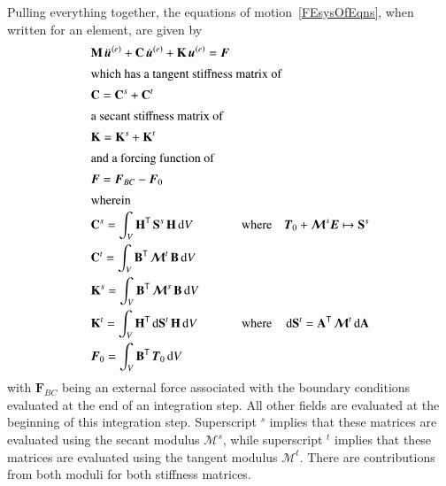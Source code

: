 Pulling everything together, the equations of motion~\eqref{FEsysOfEqns}, when written for an element, are given by
\begin{subequations}
    \label{EOM}
    \begin{align}
    \mbox{} & \mathbf{M} \, \ddot{\boldsymbol{u}}^{(e)} + 
    \mathbf{C} \, \dot{\boldsymbol{u}}^{(e)} + 
    \mathbf{K} \, \boldsymbol{u}^{(e)} = \boldsymbol{F} & & & \\
    \intertext{which has a tangent stiffness matrix of}
    \mbox{} & \mathbf{C} = \mathbf{C}^s + \mathbf{C}^t & & & \\
    \intertext{a secant stiffness matrix of}
    \mbox{} & \mathbf{K} = \mathbf{K}^s + \mathbf{K}^t & & & \\
    \intertext{and a forcing function of}    
    \mbox{} & \boldsymbol{F} = \boldsymbol{F}_{BC} - \boldsymbol{F}_0 & & & \\
    \intertext{wherein} 
    \mbox{} & \mathbf{C}^s = \int_V \mathbf{H}^{\mathsf{T}} \, 
        \mathbf{S}^s \, \mathbf{H} \, \mathrm{d}V
        & & \text{where} & \boldsymbol{T}_0 + 
        \boldsymbol{\mathcal{M}}^s \boldsymbol{E} \mapsto \mathbf{S}^s \\
    \mbox{} & \mathbf{C}^t = \int_V \mathbf{B}^{\mathsf{T}} \, 
        \boldsymbol{\mathcal{M}}^t \, \mathbf{B} \, \mathrm{d}V & & & \\
    \mbox{} & \mathbf{K}^s = \int_V \mathbf{B}^{\mathsf{T}} \, 
        \boldsymbol{\mathcal{M}}^s \, \mathbf{B} \, \mathrm{d}V & & & \\
    \mbox{} & \mathbf{K}^t = \int_V \mathbf{H}^{\mathsf{T}} \, 
        \mathrm{d}\mathbf{S}^t \, \mathbf{H} \, \mathrm{d}V 
        & & \text{where} &
        \mathrm{d}\mathbf{S}^t = \mathbf{A}^{\mathsf{T}} \, 
        \boldsymbol{\mathcal{M}}^t \, \mathrm{d} \mathbf{A} \\
    \mbox{} & \boldsymbol{F}_0 = \int_V \mathbf{B}^{\mathsf{T}} \, \boldsymbol{T}_0 \,
        \mathrm{d}V & & &
    \end{align} 
\end{subequations}
with $\boldsymbol{F}_{BC}$ being an external force associated with the boundary conditions evaluated at the end of an integration step.  All other fields are evaluated at the beginning of this integration step.  Superscript $\mbox{}^s$ implies that these matrices are evaluated using the secant modulus $\boldsymbol{\mathcal{M}}^s$, while superscript $\mbox{}^t$ implies that these matrices are evaluated using the tangent modulus $\boldsymbol{\mathcal{M}}^t$.  There are contributions from both moduli for both stiffness matrices.

